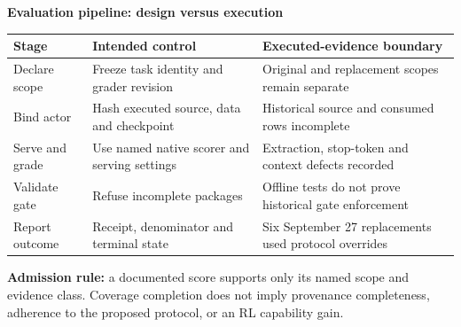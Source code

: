 \documentclass[border=8pt]{standalone}
\begin{document}
\begin{minipage}{15.2cm}\sffamily\small
{\Large\bfseries\color{ink} Evaluation pipeline: design versus execution}\par\medskip
\renewcommand{\arraystretch}{1.4}
\begin{tabular}{@{}p{3.6cm}p{5.2cm}p{5.5cm}@{}}\toprule
Stage & Intended control & Executed-evidence boundary\\\midrule
Declare scope & Freeze task identity and grader revision & Original and replacement scopes remain separate\\
Bind actor & Hash executed source, data and checkpoint & Historical source and consumed rows incomplete\\
Serve and grade & Use named native scorer and serving settings & Extraction, stop-token and context defects recorded\\
Validate gate & Refuse incomplete packages & Offline tests do not prove historical gate enforcement\\
Report outcome & Receipt, denominator and terminal state & Six September 27 replacements used protocol overrides\\\bottomrule
\end{tabular}\par\medskip
\textbf{Admission rule:} a documented score supports only its named scope and evidence class. Coverage completion does not imply provenance completeness, adherence to the proposed protocol, or an RL capability gain.
\end{minipage}
\end{document}
